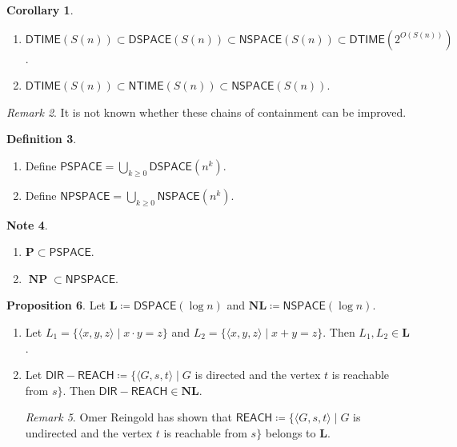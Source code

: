 \documentclass[10pt,letterpaper,cm]{nupset}
\theoremstyle{definition}
\newtheorem{definition}{Definition}[subsection]
\newtheorem{note}[definition]{Note}
\theoremstyle{theorem}
\newtheorem{prop}[definition]{Proposition}
\newtheorem{corollary}[definition]{Corollary}
\theoremstyle{remark}
\newtheorem{remark}[definition]{Remark}
\newcommand{\1}{\mathbf{1}}
\newcommand{\0}{\vec 0}
\DeclareMathOperator{\NP}{\mathbf{NP}}
\begin{document}
\begin{corollary} $ $
\begin{enumerate}
\item $\mathsf{DTIME}(S(n)) \subset \mathsf{DSPACE}(S(n)) \subset \mathsf{NSPACE}(S(n)) \subset \mathsf{DTIME}(2^{O(S(n))})$.
\item $\mathsf{DTIME}(S(n)) \subset \mathsf{NTIME}(S(n)) \subset \mathsf{NSPACE}(S(n))$.
\end{enumerate}
\end{corollary}

\begin{remark}
It is not known whether these chains of containment can be improved. 
\end{remark}

\begin{definition} $ $
\begin{enumerate}
\item Define $\mathsf{PSPACE} = \bigcup_{k\geq 0} \mathsf{DSPACE}(n^k)$.
\item Define $\mathsf{NPSPACE} = \bigcup_{k \geq 0} \mathsf{NSPACE}(n^k)$.
\end{enumerate}
\end{definition}

\begin{note} $ $
\begin{enumerate}
\item $\mathbf{P} \subset \mathsf{PSPACE}$.
\item $\NP \subset \mathsf{NPSPACE}$.
\end{enumerate}
\end{note}

\begin{prop}
Let $\mathbf{L} \coloneqq \mathsf{DSPACE}(\log{n})$ and $\mathbf{NL}\coloneqq \mathsf{NSPACE}(\log{n})$. 
\begin{enumerate}
\item Let $L_1 = \{\langle x,y,z \rangle \mid x \cdot y = z\}$ and $L_2 = \{\langle x,y,z \rangle \mid x+y = z\}$. Then $L_1, L_2 \in \mathbf{L}$.
\item Let $\mathsf{DIR{-}REACH} \coloneqq \{\langle G, s, t \rangle \mid G$ is directed and the vertex $t$ is reachable from $s\}$. Then $\mathsf{DIR{-}REACH}  \in \mathbf{NL}$.
\begin{remark}
Omer Reingold has shown that $\mathsf{REACH} \coloneqq  \{\langle G, s, t \rangle \mid G$ is undirected and the vertex $t$ is reachable from $s\}$ belongs to $\mathbf{L}$.
\end{remark}
\end{enumerate}
\end{prop}
\end{document}
